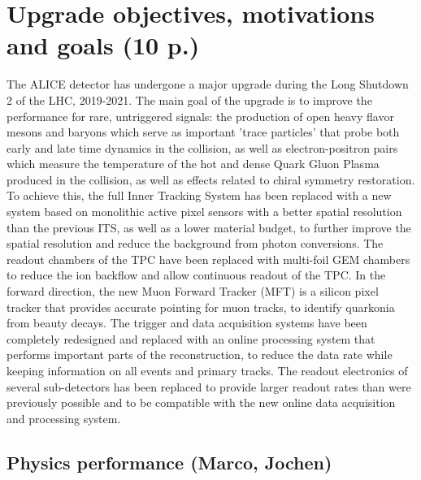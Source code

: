 \section{Upgrade objectives, motivations and goals (10 p.)}

The ALICE detector has undergone a major upgrade during the Long Shutdown 2 of the LHC, 2019-2021.
The main goal of the upgrade is to improve the performance for rare, untriggered signals: the production of open heavy flavor mesons and baryons which serve as important 'trace particles' that probe both early and late time dynamics in the collision, as well as electron-positron pairs which measure the temperature of the hot and dense Quark Gluon Plasma produced in the collision, as well as effects related to chiral symmetry restoration.
To achieve this, the full Inner Tracking System has been replaced with a new system based on monolithic active pixel sensors with a better spatial resolution than the previous ITS, as well as a lower material budget, to further improve the spatial resolution and reduce the background from photon conversions. The readout chambers of the TPC have been replaced with multi-foil GEM chambers to reduce the ion backflow and allow continuous readout of the TPC.
In the forward direction, the new Muon Forward Tracker (MFT) is a silicon pixel tracker that provides accurate pointing for muon tracks, to identify quarkonia from beauty decays.
The trigger and data acquisition systems have been completely redesigned and replaced with an online processing system that performs important parts of the reconstruction, to reduce the data rate while keeping information on all events and primary tracks. The readout electronics of several sub-detectors has been replaced to provide larger readout rates than were previously possible and to be compatible with the new online data acquisition and processing system. 

\subsection{Physics performance (Marco, Jochen)}

